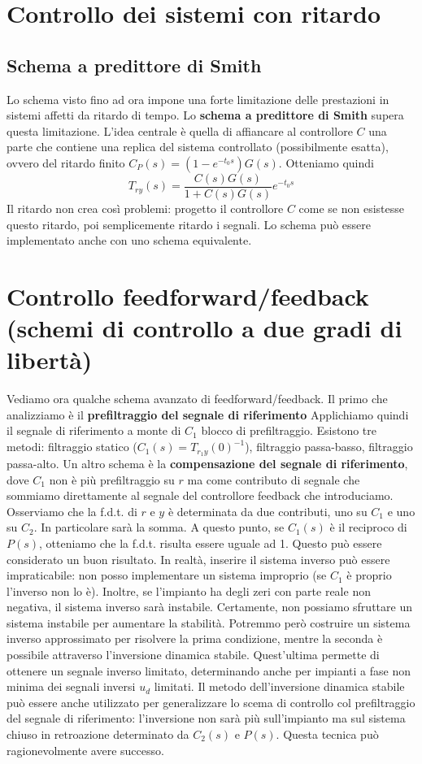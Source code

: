 \documentclass[11pt]{article}
\begin{document}
\section{Controllo dei sistemi con ritardo}
\subsection{Schema a predittore di Smith}
Lo schema visto fino ad ora impone una forte limitazione delle prestazioni in sistemi affetti da ritardo di tempo. Lo \textbf{schema a predittore di Smith} supera questa limitazione. L'idea centrale è quella di affiancare al controllore $C$ una parte che contiene una replica del sistema controllato (possibilmente esatta), ovvero del ritardo finito $C_P(s)=(1-e^{-t_0s})G(s)$. Otteniamo quindi
\begin{displaymath}
    T_{ry}(s)=\frac{C(s)G(s)}{1+C(s)G(s)}e^{-t_0s}
\end{displaymath}
Il ritardo non crea così problemi: progetto il controllore $C$ come se non esistesse questo ritardo, poi semplicemente ritardo i segnali. Lo schema può essere implementato anche con uno schema equivalente.
\section{Controllo feedforward/feedback (schemi di controllo a due gradi di libertà)}
Vediamo ora qualche schema avanzato di feedforward/feedback. Il primo che analizziamo è il \textbf{prefiltraggio del segnale di riferimento}
Applichiamo quindi il segnale di riferimento a monte di $C_1$ blocco di prefiltraggio. Esistono tre metodi: filtraggio statico ($C_1(s)=T_{r_1y}(0)^{-1}$), filtraggio passa-basso, filtraggio passa-alto. Un altro schema è la \textbf{compensazione del segnale di riferimento}, dove $C_1$ non è più prefiltraggio su $r$ ma come contributo di segnale che sommiamo direttamente al segnale del controllore feedback che introduciamo. Osserviamo che la f.d.t. di $r$ e $y$ è determinata da due contributi, uno su $C_1$ e uno su $C_2$. In particolare sarà la somma. A questo punto, se $C_1(s)$ è il reciproco di $P(s)$, otteniamo che la f.d.t. risulta essere uguale ad 1. Questo può essere considerato un buon risultato. In realtà, inserire il sistema inverso può essere impraticabile: non posso implementare un sistema improprio (se $C_1$ è proprio l'inverso non lo è). Inoltre, se l'impianto ha degli zeri con parte reale non negativa, il sistema inverso sarà instabile. Certamente, non possiamo sfruttare un sistema instabile per aumentare la stabilità.
Potremmo però costruire un sistema inverso approssimato per risolvere la prima condizione, mentre la seconda è possibile attraverso l'inversione dinamica stabile.
Quest'ultima permette di ottenere un segnale inverso limitato, determinando anche per impianti a fase non minima dei segnali inversi $u_d$ limitati. Il metodo dell'inversione dinamica stabile può essere anche utilizzato per generalizzare lo scema di controllo col prefiltraggio del segnale di riferimento: l'inversione non sarà più sull'impianto ma sul sistema chiuso in retroazione determinato da $C_2(s)$ e $P(s)$. Questa tecnica può ragionevolmente avere successo.
\end{document}
